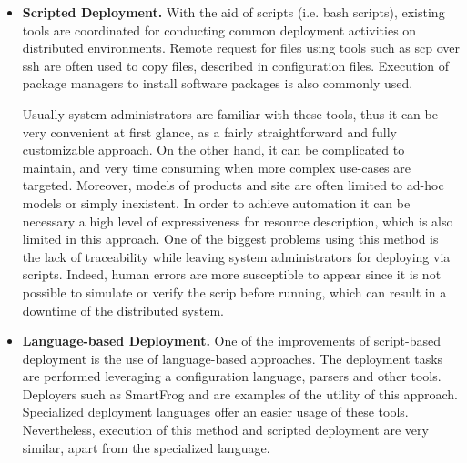 \begin{itemize}
	\item \textbf{Scripted Deployment.} With the aid of scripts (i.e. bash scripts), existing tools are coordinated for conducting common deployment activities on distributed environments.
	Remote request for files using tools such as scp over ssh are often used to copy files, described in configuration files.
	Execution of package managers to install software packages is also commonly used.
	
	Usually system administrators are familiar with these tools, thus it can be very convenient at first glance, as a fairly straightforward and fully customizable approach.
	On the other hand, it can be complicated to maintain, and very time consuming when more complex use-cases are targeted.
	Moreover, models of products and site are often limited to ad-hoc models or simply inexistent.
	In order to achieve automation it can be necessary a high level of expressiveness for resource description, which is also limited in this approach.
	One of the biggest problems using this method is the lack of traceability while leaving system administrators for deploying via scripts.
	Indeed, human errors are more susceptible to appear since it is not possible to simulate or verify the scrip before running, which can result in a downtime of the distributed system.
	
	\item \textbf{Language-based Deployment.} One of the improvements of script-based deployment is the use of language-based approaches.
	The deployment tasks are performed leveraging a configuration language, parsers and other tools.
	Deployers such as SmartFrog\cite{goldsack2003smartfrog} and \cite{wang2006language} are examples of the utility of this approach.
	Specialized deployment languages offer an easier usage of these tools.
	Nevertheless, execution of this method and scripted deployment are very similar, apart from the specialized language.
	

\end{itemize}
